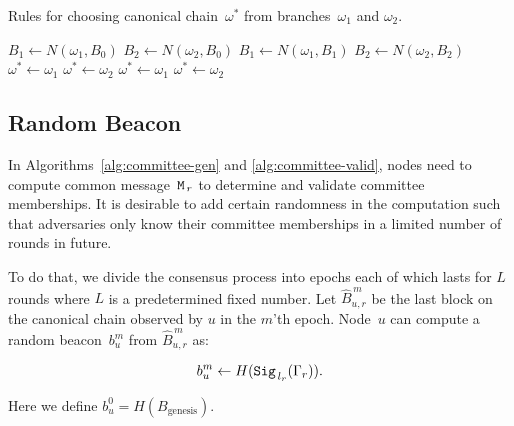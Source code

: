 \documentclass{article}
\begin{document}
\begin{algorithm}[H]
\caption{Rules for choosing canonical chain~$\omega^*$ from branches~$\omega_1$ and $\omega_2$.}
\label{alg:canonical-chain}
\begin{spacing}{1.2}
\begin{algorithmic}[1]
    \vspace{1ex}
    \State $B_1\leftarrow N(\omega_1,B_0)$
    \State $B_2\leftarrow N(\omega_2,B_0)$
    \vspace{1ex}
        \State $B_1\leftarrow N(\omega_1,B_1)$
        \State $B_2\leftarrow N(\omega_2,B_2)$
    \EndWhile
    \vspace{1ex}
        \State $\omega^*\leftarrow\omega_1$
        \State $\omega^*\leftarrow\omega_2$
    \Else
            \State $\omega^*\leftarrow\omega_1$
        \Else
            \State $\omega^*\leftarrow\omega_2$
        \EndIf
    \EndIf
\end{algorithmic}
\end{spacing}
\end{algorithm}

\subsection{Random Beacon}
\label{sec:beacon}

In Algorithms~\ref{alg:committee-gen} and \ref{alg:committee-valid}, nodes need to compute common message~${\tt M}_{\,r}$ to determine and validate committee memberships. It is desirable to add certain randomness in the computation such that adversaries only know their committee memberships in a limited number of rounds in future.

To do that, we divide the consensus process into epochs each of which lasts for $L$ rounds where $L$ is a predetermined fixed number. Let $\hat{B}_{u,r}^{\,m}$ be the last block on the canonical chain observed by $u$ in the $m$'th epoch. Node~$u$ can compute a random beacon~$b_u^m$ from $\hat{B}_{u,r}^{\,m}$ as:

\begin{equation}
    b_u^m \leftarrow H({\tt Sig}_{\,l_r}(\Gamma_{r})).
\end{equation}

Here we define $b_u^0=H(B_{\textrm{genesis}})$.
\end{document}
